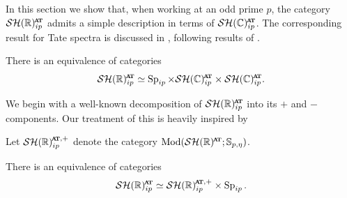 In this section we show that, when working at an odd prime $p$, the category $\SHR^{\at}_{ip}$ admits a simple description in terms of $\SHCat$. The corresponding result for Tate spectra is discussed in \cite[p.23-24]{BehrensShah}, following results of \cite{RealEtale}.

\begin{prop}\label{prop:odd}
  There is an equivalence of categories
  \[ \SHR^{\at}_{ip} \simeq \Sp_{ip} \times \SHCat \times \SHCat. \]
\end{prop}

We begin with a well-known decomposition of $\SHR^{\at} _{ip}$ into its $+$ and $-$ components. Our treatment of this is heavily inspired by \cite[pp.23-25]{BehrensShah}

\begin{dfn}
  Let $\SHR_{ip}^{\at,+}$ denote the category $\Mod ( \SHR^{\at} ; \Ss_{p,\eta} )$. 
\end{dfn}

\begin{lem}
  There is an equivalence of categories
  \[\SHR^{\at} _{ip} \simeq \SHR^{\at,+} _{ip} \times \Sp_{ip}.\]
\end{lem}

